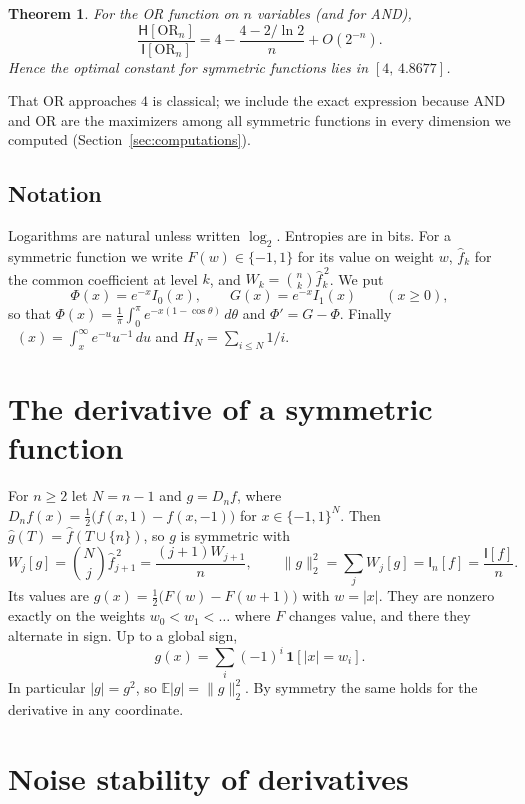 \documentclass[11pt]{amsart}
\newtheorem{mainthm}{Theorem}
\theoremstyle{definition}
\theoremstyle{remark}
\newcommand{\bits}{\{-1,1\}}
\newcommand{\E}{\mathbb E}
\newcommand{\HH}{\mathsf H}
\newcommand{\I}{\mathsf I}
\newcommand{\wh}[1]{\widehat{#1}}
\DeclareMathOperator{\Ei}{E_1}
\begin{document}
\begin{mainthm}\label{thm:lower}
For the OR function on $n$ variables (and for AND),
\[
 \frac{\HH[\mathrm{OR}_n]}{\I[\mathrm{OR}_n]}=4-\frac{4-2/\ln2}{n}+O(2^{-n}).
\]
Hence the optimal constant for symmetric functions lies in $[4,\,4.8677]$.
\end{mainthm}

That OR approaches $4$ is classical; we include the exact expression because AND and OR are the maximizers among all symmetric functions in every dimension we computed (Section~\ref{sec:computations}).

\subsection*{Notation}
Logarithms are natural unless written $\log_2$. Entropies are in bits. For a symmetric function we write $F(w)\in\bits$ for its value on weight $w$, $\wh f_k$ for the common coefficient at level $k$, and $W_k=\binom nk\wh f_k^{\,2}$. We put
\[
 \Phi(x)=e^{-x}I_0(x),\qquad G(x)=e^{-x}I_1(x)\qquad(x\ge0),
\]
so that $\Phi(x)=\frac1\pi\int_0^\pi e^{-x(1-\cos\theta)}\,d\theta$ and $\Phi'=G-\Phi$. Finally $\Ei(x)=\int_x^\infty e^{-u}u^{-1}\,du$ and $H_N=\sum_{i\le N}1/i$.

\section{The derivative of a symmetric function}\label{sec:split}

For $n\ge2$ let $N=n-1$ and $g=D_nf$, where $D_nf(x)=\tfrac12\bigl(f(x,1)-f(x,-1)\bigr)$ for $x\in\bits^N$. Then $\wh g(T)=\wh f(T\cup\{n\})$, so $g$ is symmetric with
\begin{equation}\label{eq:derivative}
 W_j[g]=\binom Nj\wh f_{j+1}^{\,2}=\frac{(j+1)W_{j+1}}{n},\qquad \|g\|_2^2=\sum_jW_j[g]=\I_n[f]=\frac{\I[f]}n.
\end{equation}
Its values are $g(x)=\tfrac12\bigl(F(w)-F(w+1)\bigr)$ with $w=|x|$. They are nonzero exactly on the weights $w_0<w_1<\dots$ where $F$ changes value, and there they alternate in sign. Up to a global sign,
\begin{equation}\label{eq:alternating}
 g(x)=\sum_{i}(-1)^i\,\mathbf 1[|x|=w_i].
\end{equation}
In particular $|g|=g^2$, so $\E|g|=\|g\|_2^2$. By symmetry the same holds for the derivative in any coordinate.

\section{Noise stability of derivatives}\label{sec:stab}
\end{document}
